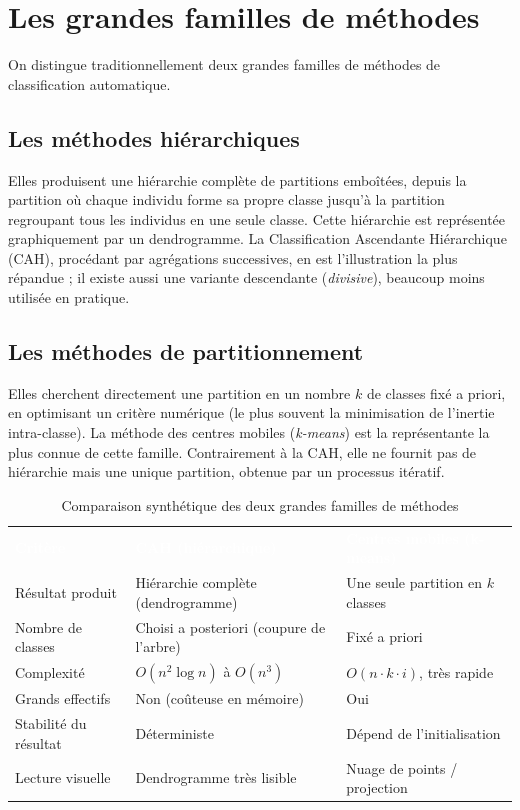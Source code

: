 \documentclass[11pt,a4paper]{report}
\begin{document}
	\section{Les grandes familles de méthodes}
	
	On distingue traditionnellement deux grandes familles de méthodes de classification automatique.
	
	\subsection{Les méthodes hiérarchiques}
	
	Elles produisent une hiérarchie complète de partitions emboîtées, depuis la partition où chaque individu forme sa propre classe jusqu'à la partition regroupant tous les individus en une seule classe. Cette hiérarchie est représentée graphiquement par un dendrogramme. La Classification Ascendante Hiérarchique (CAH), procédant par agrégations successives, en est l'illustration la plus répandue ; il existe aussi une variante descendante (\emph{divisive}), beaucoup moins utilisée en pratique.
	
	\subsection{Les méthodes de partitionnement}
	
	Elles cherchent directement une partition en un nombre $k$ de classes fixé a priori, en optimisant un critère numérique (le plus souvent la minimisation de l'inertie intra-classe). La méthode des centres mobiles (\emph{k-means}) est la représentante la plus connue de cette famille. Contrairement à la CAH, elle ne fournit pas de hiérarchie mais une unique partition, obtenue par un processus itératif.
	
	\begin{table}[h]
		\centering
		\small
		\begin{tabularx}{\textwidth}{>{\raggedright\arraybackslash}p{3.6cm} X X}
			\rowcolor{navy}
			\textcolor{white}{\bfseries Critère} & \textcolor{white}{\bfseries CAH (hiérarchique)} & \textcolor{white}{\bfseries Centres mobiles (k-means)} \\
			Résultat produit & Hiérarchie complète (dendrogramme) & Une seule partition en $k$ classes \\
			Nombre de classes & Choisi a posteriori (coupure de l'arbre) & Fixé a priori \\
			Complexité & $O(n^2 \log n)$ à $O(n^3)$ & $O(n \cdot k \cdot i)$, très rapide \\
			Grands effectifs & Non (coûteuse en mémoire) & Oui \\
			Stabilité du résultat & Déterministe & Dépend de l'initialisation \\
			Lecture visuelle & Dendrogramme très lisible & Nuage de points / projection \\
		\end{tabularx}
		\caption{Comparaison synthétique des deux grandes familles de méthodes}
	\end{table}
	
\end{document}
